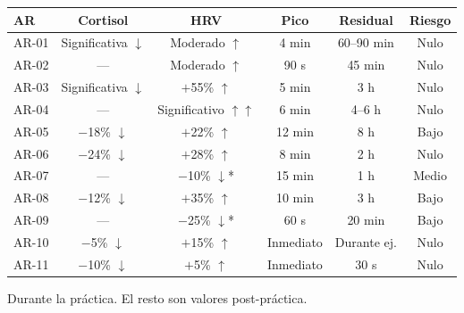 \documentclass[12pt,a4paper]{article}
\begin{document}
\begin{longtable}{lccccc}
    \toprule
    \textbf{AR} & \textbf{Cortisol} & \textbf{HRV} & \textbf{Pico} & \textbf{Residual} & \textbf{Riesgo} \\
    \midrule
    \endhead
    \bottomrule
    \endfoot
    AR-01 & Significativa $\downarrow$ & Moderado $\uparrow$ & 4 min & 60--90 min & Nulo \\
    AR-02 & — & Moderado $\uparrow$ & 90 s & 45 min & Nulo \\
    AR-03 & Significativa $\downarrow$ & $+$55\% $\uparrow$ & 5 min & 3 h & Nulo \\
    AR-04 & — & Significativo $\uparrow\uparrow$ & 6 min & 4--6 h & Nulo \\
    AR-05 & $-$18\% $\downarrow$ & $+$22\% $\uparrow$ & 12 min & 8 h & Bajo \\
    AR-06 & $-$24\% $\downarrow$ & $+$28\% $\uparrow$ & 8 min & 2 h & Nulo \\
    AR-07 & — & $-$10\% $\downarrow$* & 15 min & 1 h & Medio \\
    AR-08 & $-$12\% $\downarrow$ & $+$35\% $\uparrow$ & 10 min & 3 h & Bajo \\
    AR-09 & — & $-$25\% $\downarrow$* & 60 s & 20 min & Bajo \\
    AR-10 & $-$5\% $\downarrow$ & $+$15\% $\uparrow$ & Inmediato & Durante ej. & Nulo \\
    AR-11 & $-$10\% $\downarrow$ & $+$5\% $\uparrow$ & Inmediato & 30 s & Nulo \\
\end{longtable}
\vspace{0.2cm}
{\small * Durante la práctica. El resto son valores post-práctica.}
\end{document}
